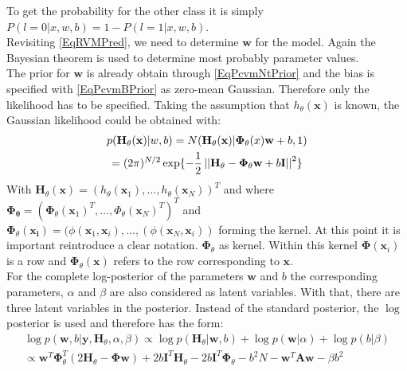 To get the probability for the other class it is simply $P(l=0 \vert x,w,b) = 1-P(l=1\vert x,w,b)$.\cite{Chen.2009}\\
Revisiting \eqref{EqRVMPred}, we need to determine $\mathbf{w}$ for the model.
Again the Bayesian theorem is used to determine most probably parameter values.\cite{Chen.2009}\\
The prior for $\mathbf{w}$ is already obtain through \ref{EqPcvmNtPrior} and the bias is specified with \eqref{EqPcvmBPrior} as zero-mean Gaussian. Therefore only the likelihood has to be specified.
Taking the assumption that $h_\theta (\mathbf{x})$ is known, the Gaussian likelihood could be obtained with:\cite{Chen.2009}
\begin{equation}\label{EqPcGausLike}
\begin{gathered}
	p(\mathbf{H}_\theta(\mathbf{x})\vert w,b) = N(\mathbf{H}_\theta(\mathbf{x})\vert \mathbf{\Phi}_\theta(x)\mathbf{w}+b,1)\\
	= (2\pi)^{N/2}\exp\{-\frac{1}{2} \left\vert\left\vert\mathbf{H}_{\theta} - \mathbf{\Phi}_{\theta}\mathbf{w}+b\mathbf{I}\right\vert\right\vert^2 \}
\end{gathered}
\end{equation}
With $\mathbf{H}_\theta(\mathbf{x}) = (h_\theta(\mathbf{x}_1),\dots,h_\theta(\mathbf{x}_N))^T$ and where $\mathbf{\Phi_\theta} = (\mathbf{\Phi}_\theta(\mathbf{x}_1)^T,\dots,\Phi_\theta(\mathbf{x}_N)^T)^T$ and $\mathbf{\Phi}_\theta(\mathbf{x_i}) = (\phi(\mathbf{x}_1,\mathbf{x}_i),\dots,(\phi(\mathbf{x}_N,\mathbf{x}_i))$ forming the kernel.
At this point it is important reintroduce a clear notation.
$\mathbf{\Phi}_\theta$ as kernel. Within this kernel $\mathbf{\Phi}(\mathbf{x}_i)$ is a row and $\mathbf{\Phi}_\theta(\mathbf{x})$ refers to the row corresponding to $\mathbf{x}$.\\
For the complete log-posterior of the parameters $\mathbf{w}$ and $b$ the corresponding parameters, $\alpha$ and $\beta$ are also considered as latent variables.
With that, there are three latent variables in the posterior.
Instead of the standard posterior, the $\log$ posterior is used and therefore has the form:\cite{Chen.2009}
\begin{equation}\label{EqPcvmInf}
\begin{gathered}
	\log p(\mathbf{w},b\vert \mathbf{y},\mathbf{H}_\theta,\alpha,\beta) \propto \log p(\mathbf{H}_\theta \vert \mathbf{w},b) + \log p(\mathbf{w}\vert \alpha) + \log p(b\vert \beta)\\
	\propto \mathbf{w}^T\mathbf{\Phi}_\theta^T(2\mathbf{H}_\theta - \mathbf{\Phi}\mathbf{w})+2b\mathbf{I}^T\mathbf{H}_\theta - 2b\mathbf{I}^T\mathbf{\Phi}_\theta - b^2N - \mathbf{w}^T\mathbf{Aw}-\beta b^2
\end{gathered}
\end{equation}
